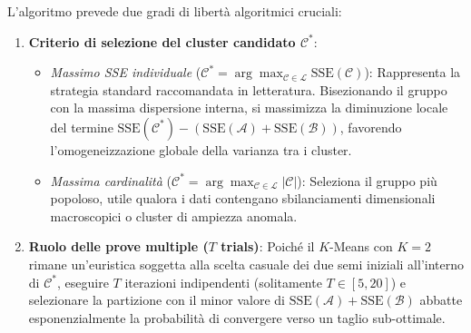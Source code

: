 L'algoritmo prevede due gradi di libertà algoritmici cruciali:
\begin{enumerate}
    \item \textbf{Criterio di selezione del cluster candidato $\mathcal{C}^*$}:
    \begin{itemize}
        \item \textit{Massimo SSE individuale} ($\mathcal{C}^* = \arg\max_{\mathcal{C} \in \mathcal{L}} \mathrm{SSE}(\mathcal{C})$): Rappresenta la strategia standard raccomandata in letteratura. Bisezionando il gruppo con la massima dispersione interna, si massimizza la diminuzione locale del termine $\mathrm{SSE}(\mathcal{C}^*) - (\mathrm{SSE}(\mathcal{A}) + \mathrm{SSE}(\mathcal{B}))$, favorendo l'omogeneizzazione globale della varianza tra i cluster.
        \item \textit{Massima cardinalità} ($\mathcal{C}^* = \arg\max_{\mathcal{C} \in \mathcal{L}} |\mathcal{C}|$): Seleziona il gruppo più popoloso, utile qualora i dati contengano sbilanciamenti dimensionali macroscopici o cluster di ampiezza anomala.
    \end{itemize}
    \item \textbf{Ruolo delle prove multiple ($T$ trials)}: Poiché il $K$-Means con $K=2$ rimane un'euristica soggetta alla scelta casuale dei due semi iniziali all'interno di $\mathcal{C}^*$, eseguire $T$ iterazioni indipendenti (solitamente $T \in [5, 20]$) e selezionare la partizione con il minor valore di $\mathrm{SSE}(\mathcal{A}) + \mathrm{SSE}(\mathcal{B})$ abbatte esponenzialmente la probabilità di convergere verso un taglio sub-ottimale.
\end{enumerate}

